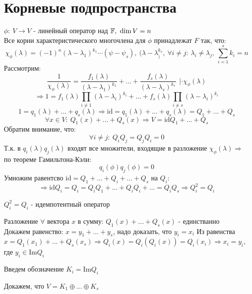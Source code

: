 \section{Корневые подпространства}
    $\phi:\ V \to V$ - линейный оператор над $\mathbb{F}, \ \dim V = n$\\
    Все корни характеристического многочлена для $\phi$ принадлежат $F$ так, что:
    $$\chi_\phi(\lambda) = (-1)^n(\lambda-\lambda_1)^{k_1} \cdots (\psi - \psi_s), \ (\lambda-\lambda_)^{k_s}, \ \forall i \neq j: \  \lambda_i \neq \lambda_j, \ \sum \limits_{i=1}^sk_i = n$$
    Рассмотрим: 
    $$\frac{1}{\chi_\phi(\lambda)} = \frac{f_1(\lambda)}{(\lambda-\lambda_1)^{k_1}} + ... + \frac{f_s(\lambda)}{(\lambda-\lambda_s)^{k_s}} \ \ | \cdot \chi_\phi(\lambda)$$ $$\Longrightarrow 1 = f_1 (\lambda) \prod\limits_{i\neq 1}(\lambda-\lambda_i)^{k_i} + ... + f_s (\lambda) \prod\limits_{i\neq s}(\lambda-\lambda_i)^{k_i}$$
    $$1= q_1(\lambda) + ... + q_s(\lambda) \Longrightarrow  \text{id} = q_1(\lambda) + ... + q_s(\lambda) = Q_1 + ... + Q_s$$
    $$\forall x \in V: \ Q_1(x) + ... + Q_s(x) \Longrightarrow V = \text{id} Q_1 + ... + Q_s$$
    Обратим внимание, что:
    $$\forall i \neq j: \ Q_iQ_j = Q_jQ_i = 0$$
    Т.к. в $q_i(\lambda)q_j(\lambda)$ входят все множители, входящие в разложение $\chi_\phi(\lambda) \Longrightarrow $ по теореме Гамильтона-Кэли: 
    $$q_i(\phi)q_j(\phi) = 0$$
    Умножим равентсво $\text{id} = Q_1+...+Q_i+...+Q_s$ на $Q_i:$ $$\Longrightarrow \text{id}Q_i = Q_i = Q_iQ_1+...+Q_iQ_i+...=Q_iQ_s \Longrightarrow Q_i^2 = Q_i$$
    \begin{definition}
        $Q_i^2 = Q_i$ - идемпотентный оператор
    \end{definition}  
    Разложение $\forall$ вектора $x$ в сумму: $Q_1(x) + ... + Q_s(x)$ - единстванно\\
    Докажем равенство: $x = y_1+ ... + y_s$, надо доказать, что $y_i = x_i$
    Из равенства $x = Q_1(x_1) + ... + Q_s(x_s) \Longrightarrow Q_i(x) = Q_i(Q_i(x)) = Q_i(x_i) \Longrightarrow x_i = y_i$, где $y_i \in \text{Im}Q_i$
    
    Введем обозначение $K_i = \text{Im}Q_i$
    
    Докажем, что $V = K_1 \oplus ... \oplus K_s$
    

